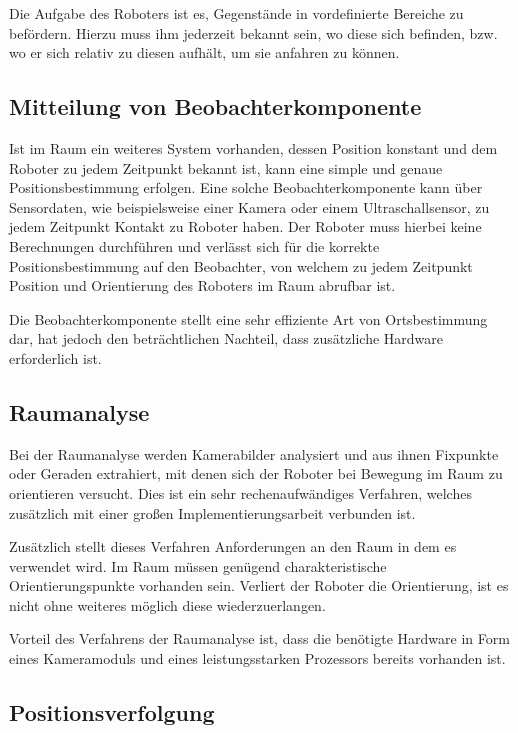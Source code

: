 Die Aufgabe des Roboters ist es, Gegenstände in vordefinierte Bereiche zu befördern. Hierzu muss ihm jederzeit bekannt sein, wo diese sich befinden, bzw. wo er sich relativ zu diesen aufhält, um sie anfahren zu können.

\subsection{Mitteilung von Beobachterkomponente}
\label{subsec:Beobachter}

Ist im Raum ein weiteres System vorhanden, dessen Position konstant und dem Roboter zu jedem Zeitpunkt bekannt ist, kann eine simple und genaue Positionsbestimmung erfolgen. Eine solche Beobachterkomponente kann über Sensordaten, wie beispielsweise einer Kamera oder einem Ultraschallsensor, zu jedem Zeitpunkt Kontakt zu Roboter haben.
Der Roboter muss hierbei keine Berechnungen durchführen und verlässt sich für die korrekte Positionsbestimmung auf den Beobachter, von welchem zu jedem Zeitpunkt Position und Orientierung des Roboters im Raum abrufbar ist.

Die Beobachterkomponente stellt eine sehr effiziente Art von Ortsbestimmung dar, hat jedoch den beträchtlichen Nachteil, dass zusätzliche Hardware erforderlich ist.

\subsection{Raumanalyse}

Bei der Raumanalyse werden Kamerabilder analysiert und aus ihnen Fixpunkte oder Geraden extrahiert, mit denen sich der Roboter bei Bewegung im Raum zu orientieren versucht. Dies ist ein sehr rechenaufwändiges Verfahren, welches zusätzlich mit einer großen Implementierungsarbeit verbunden ist.

Zusätzlich stellt dieses Verfahren Anforderungen an den Raum in dem es verwendet wird. Im Raum müssen genügend charakteristische Orientierungspunkte vorhanden sein. Verliert der Roboter die Orientierung, ist es nicht ohne weiteres möglich diese wiederzuerlangen.

Vorteil des Verfahrens der Raumanalyse ist, dass die benötigte Hardware in Form eines Kameramoduls und eines leistungsstarken Prozessors bereits vorhanden ist.

\subsection{Positionsverfolgung}


